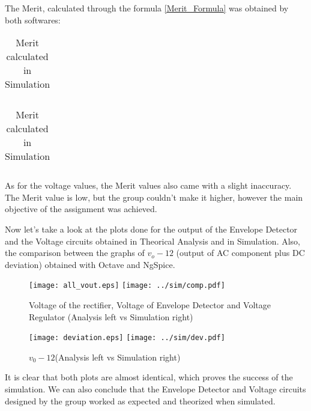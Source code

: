 \par The Merit, calculated through the formula \ref{Merit_Formula} was obtained by both softwares:

\begin{table}[H]
	\begin{minipage}{.5\linewidth}
		\centering
		\begin{tabular}{|c|c|}
		\hline
		
		\end{tabular}
		\caption{Merit calculated in Theoretical Analysis}
		\label{table1a}
	\end{minipage}
	\begin{minipage}{.5\linewidth}
		\centering
		\begin{tabular}{|c|c|}
		\hline
		
		\end{tabular}
 		\caption{Merit calculated in Simulation}
		\label{table1b}
	\end{minipage} 
\end{table}

\par As for the voltage values, the Merit values also came with a slight inaccuracy. The Merit value is low, but the group couldn't make it higher, however the main objective of the assignment was achieved.

\par Now let's take a look at the plots done for the output of the Envelope Detector and the Voltage circuits obtained in Theorical Analysis and in Simulation. Also, the comparison between the graphs of $v_o - 12$ (output of AC component plus DC deviation) obtained with Octave and NgSpice.

\begin{figure}[H]
    \texttt{[image: all\_vout.eps]}
    \hfill\texttt{[image: ../sim/comp.pdf]}
    \centering
    \caption{Voltage of the rectifier, Voltage of Envelope Detector and Voltage Regulator (Analysis left vs Simulation right)}
    \label{mag}
\end{figure}

\begin{figure}[H]
    \texttt{[image: deviation.eps]}
    \hfill\texttt{[image: ../sim/dev.pdf]}
    \centering
    \caption{$v_0-12$(Analysis left vs Simulation right)}
    \label{mag}
\end{figure}

\par It is clear that both plots are almost identical, which proves the success of the simulation. We can also conclude that the Envelope Detector and Voltage circuits designed by the group worked as expected and theorized when simulated.

